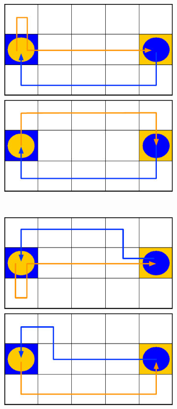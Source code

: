 \begin{figure}
    \centering
    \begin{subfigure}[b]{0.18\textwidth}
        \includegraphics[width=\textwidth]{figures/interactive1}
        \caption{}
        \label{fig:inter1}
    \end{subfigure}
    ~ %
    \begin{subfigure}[b]{0.18\textwidth}
        \includegraphics[width=\textwidth]{figures/interactive2}

\end{subfigure}
\end{figure}
